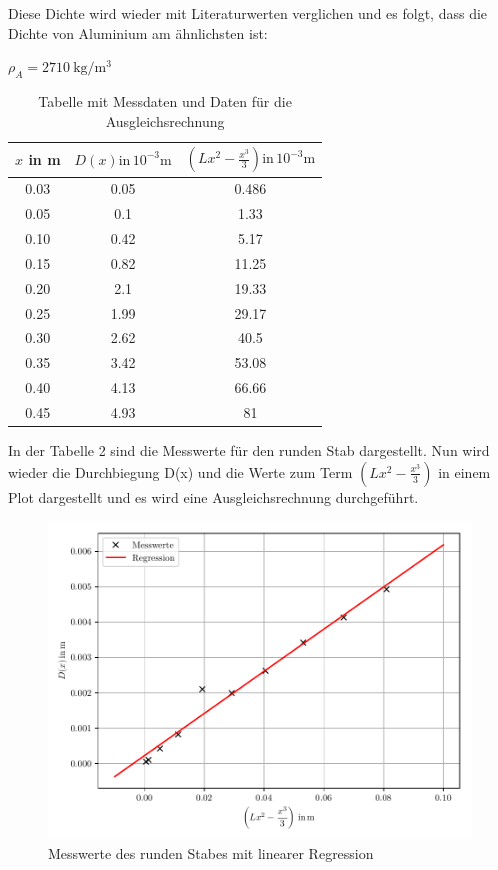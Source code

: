Diese Dichte wird wieder mit Literaturwerten verglichen und es folgt, dass die Dichte
von Aluminium am ähnlichsten ist:\\
\centerline{$\rho_A = \SI[per-mode=fraction]{2710}{\kilo\gram\per\meter
\tothe{3}}$}

\begin{table}
  \centering
  \caption{Tabelle mit Messdaten und Daten für die Ausgleichsrechnung}
  \begin{tabular}{c c c}
  \toprule
  $x$ in \si{\meter} & $D(x) \text{in} \, 10^{-3}\si{\meter}$ & $\left(Lx^2-\frac{x^3}{3}\right) \text{in} \, 10^{-3}\si{\meter}$ \\
  \midrule
  0.03 & 0.05 &   0.486 \\
  0.05 & 0.1 & 1.33 \\
  0.10 & 0.42 &   5.17 \\
  0.15 & 0.82 &   11.25 \\
  0.20 & 2.1  & 19.33 \\
  0.25 & 1.99 &   29.17 \\
  0.30 & 2.62 &   40.5 \\
  0.35 & 3.42 &   53.08 \\
  0.40 & 4.13 &   66.66 \\
  0.45 & 4.93 &   81 \\
  \bottomrule
  \end{tabular}
\end{table}

In der Tabelle 2 sind die Messwerte für den runden Stab dargestellt. Nun wird wieder
die Durchbiegung D(x) und die Werte zum Term $\left(Lx^2-\frac{x^3}{3}\right)$ in
einem Plot dargestellt und es wird eine Ausgleichsrechnung durchgeführt.

\begin{figure}[H]
  \centering
  \includegraphics[width=\textwidth]{ausgleichsgerade2.pdf}
  \caption{Messwerte des runden Stabes mit linearer Regression}
\end{figure}

